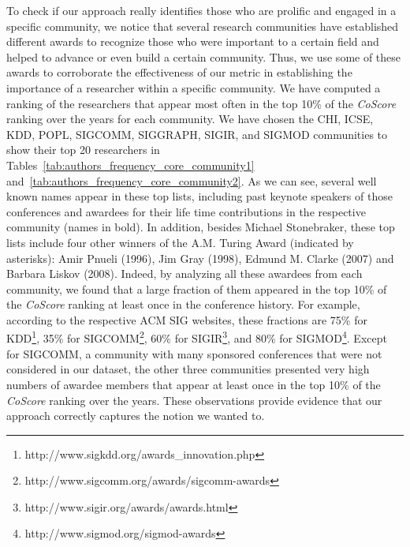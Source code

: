 \documentclass{sig-alternate-10pt}
\begin{document}
To check if our approach really identifies  those who are prolific and engaged in a specific community,
we notice that several research communities have established different awards to recognize those who were important to a certain field and helped to advance or even build a certain community. Thus, we use some of these awards to corroborate the effectiveness of our metric in establishing the importance of a researcher within a specific community.
We have computed a ranking of the researchers that appear most often in the top 10\% of the \textit{CoScore} ranking over the years for each community. We have chosen the CHI, ICSE, KDD, POPL, SIGCOMM, SIGGRAPH, SIGIR, and SIGMOD communities to show their top 20 researchers in Tables~\ref{tab:authors_frequency_core_community1} and~\ref{tab:authors_frequency_core_community2}. As we can see, several well known names appear in these top lists, including past keynote speakers of those conferences and awardees for their life time contributions in the respective community (names in bold). In addition, besides Michael Stonebraker, these top lists include four other winners of the A.M. Turing Award (indicated by asterisks): Amir Pnueli (1996), Jim Gray (1998), Edmund M. Clarke (2007) and Barbara Liskov (2008). Indeed, by analyzing all these awardees from each community, we found that a large fraction of them appeared in the top 10\% of the \textit{CoScore} ranking at least once in the conference history. For example, according to the respective ACM SIG websites, these fractions are 75\% for KDD\footnote{http://www.sigkdd.org/awards\_innovation.php}, 35\% for SIGCOMM\footnote{http://www.sigcomm.org/awards/sigcomm-awards}, 60\% for SIGIR\footnote{http://www.sigir.org/awards/awards.html}, and 80\% for SIGMOD\footnote{http://www.sigmod.org/sigmod-awards}. Except for SIGCOMM, a community with many sponsored conferences that were not considered in our dataset, the other three communities presented very high numbers of awardee members that appear at least once in the top 10\% of the \textit{CoScore} ranking over the years.  These observations provide evidence that our approach correctly captures the notion we wanted to.
\end{document}
